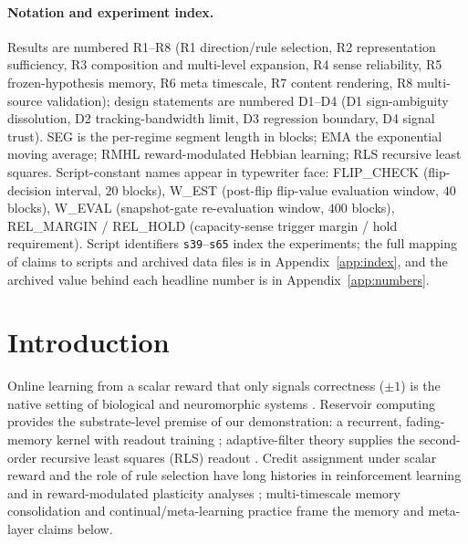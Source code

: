\documentclass[preprint,12pt]{elsarticle}
\begin{document}
\paragraph{Notation and experiment index.}
Results are numbered R1--R8 (R1 direction/rule selection, R2 representation
sufficiency, R3 composition and multi-level expansion, R4 sense reliability,
R5 frozen-hypothesis memory, R6 meta timescale, R7 content rendering, R8
multi-source validation); design statements are numbered D1--D4 (D1
sign-ambiguity dissolution, D2 tracking-bandwidth limit, D3 regression
boundary, D4 signal trust). SEG is the per-regime segment length in blocks;
EMA the exponential moving average; RMHL reward-modulated Hebbian learning;
RLS recursive least squares. Script-constant names appear in typewriter
face: FLIP\_CHECK (flip-decision interval, $20$ blocks), W\_EST (post-flip
flip-value evaluation window, $40$ blocks), W\_EVAL (snapshot-gate
re-evaluation window, $400$ blocks), REL\_MARGIN / REL\_HOLD (capacity-sense
trigger margin / hold requirement). Script identifiers \texttt{s39}--\texttt{s65}
index the experiments; the full mapping of claims to scripts and archived
data files is in Appendix~\ref{app:index}, and the archived value behind
each headline number is in Appendix~\ref{app:numbers}.

\section{Introduction}
\label{sec:intro}

Online learning from a scalar reward that only signals correctness
($\pm1$) is the native setting of biological and neuromorphic systems
\cite{hoerzer2014,pfister2006}. Reservoir computing provides the
substrate-level premise of our demonstration: a recurrent, fading-memory
kernel with readout training
\cite{jaeger2001,maass2002,lukosevicius2009,verstraeten2007,tanaka2019,
appeltant2011,larger2012,jaeger2004,pathak2018,mackeyglass1977};
adaptive-filter theory supplies the second-order recursive least squares
(RLS) readout
\cite{haykin2002,hoerl1970}. Credit assignment
under scalar reward and the role of rule selection have long histories in
reinforcement learning \cite{zinkevich2003,cesabianchi2006} and in
reward-modulated plasticity analyses \cite{hoerzer2014}; multi-timescale
memory consolidation \cite{fusi2005,benna2016,mcclelland1995} and
continual/meta-learning practice \cite{parisi2019,kirkpatrick2017,
hospedales2022,finn2017} frame the memory and meta-layer claims below.
\end{document}
